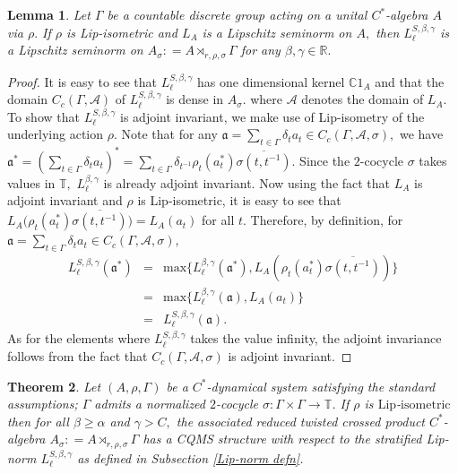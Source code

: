 \documentclass[a4paper,11pt,reqno]{amsart}
\theoremstyle{plain}
\newtheorem{thm}{Theorem}[section]
\newtheorem{lem}[thm]{Lemma}
\theoremstyle{mainthmstyle}
\theoremstyle{named}
\numberwithin{equation}{section}
\newcommand{\Bea}{\begin{eqnarray*}}
\newcommand{\Eea}{\end{eqnarray*}}
\begin{document}
\begin{lem}
Let $\Gamma$ be a countable discrete group acting on a unital $C^{\ast}$-algebra $A$ via $\rho.$ If $\rho$ is Lip-isometric and $L_A$ is a Lipschitz seminorm on $A,$ then $L_{\ell}^{S, \beta, \gamma}$ is a Lipschitz seminorm on $A_{\sigma} : = A \rtimes_{r, \rho, \sigma} \Gamma$ for any $\beta, \gamma \in \mathbb R.$
\end{lem}

\begin{proof}
It is easy to see that $L_{\ell}^{S, \beta, \gamma}$ has one dimensional kernel $\mathbb C 1_A$ and that the domain $C_c \left (\Gamma, \mathcal A \right )$ of $L_{\ell}^{S, \beta, \gamma}$ is dense in $A_{\sigma}$. where $\mathcal A$ denotes the domain of $L_A.$ To show that $L_{\ell}^{S, \beta, \gamma}$ is adjoint invariant, we make use of Lip-isometry of the underlying action $\rho.$ Note that for any $\mathfrak a = \sum\limits_{t \in \Gamma} \delta_t a_t \in C_c (\Gamma, \mathcal A, \sigma),$ we have $\mathfrak {a}^{\ast} = \left (\sum\limits_{t \in \Gamma} \delta_t a_t \right )^{\ast} = \sum\limits_{t \in \Gamma} \delta_{t^{-1}} \rho_t \left (a_t^{\ast} \right ) \overline {\sigma (t, t^{-1})}.$ Since the $2$-cocycle $\sigma$ takes values in $\mathbb T,$ $L_{\ell}^{\beta, \gamma}$ is already adjoint invariant. Now using the fact that $L_A$ is adjoint invariant and $\rho$ is Lip-isometric, it is easy to see that $L_A\big(\rho_t \left (a_t^{\ast} \right ) \overline {\sigma (t, t^{-1})}\big)=L_A(a_t)$ for all $t$. Therefore, by definition, for $\mathfrak{a}=\sum\limits_{t\in \Gamma}\delta_t a_{t}\in C_{c}(\Gamma,\mathcal A,\sigma)$, 
\Bea
L^{S,\beta,\gamma}_{\ell}(\mathfrak{a}^{\ast})&=&\mathrm{max}\{L^{\beta,\gamma}_{\ell}(\mathfrak{a}^{*}), L_{A}(\rho_t \left (a_t^{\ast} \right ) \overline {\sigma (t, t^{-1})})\}\\
&=& \mathrm{max}\{L^{\beta,\gamma}_{\ell}(\mathfrak{a}), L_A(a_t)\}\\
&=& L^{S,\beta,\gamma}_{\ell}(\mathfrak{a}).
\Eea 
As for the elements where $L^{S,\beta,\gamma}_{\ell}$ takes the value infinity, the adjoint invariance follows from the fact that $C_{c}(\Gamma,\mathcal A,\sigma)$ is adjoint invariant.
\end{proof}


\begin{thm}
Let $(A,\rho,\Gamma)$ be a $C^{\ast}$-dynamical system satisfying the standard assumptions; $\Gamma$ admits a normalized $2$-cocycle $\sigma : \Gamma \times \Gamma \rightarrow \mathbb{T}$. If $\rho$ is $\mathrm{Lip}$-$\mathrm {isometric}$ then for all $\beta \geq \alpha$ and $\gamma > C,$ the associated reduced twisted crossed product $C^{\ast}$-algebra $A_{\sigma} : = A \rtimes_{r, \rho, \sigma} \Gamma$ has a CQMS structure with respect to the stratified Lip-norm $L^{S, \beta, \gamma}_{\ell}$ as defined in Subsection \ref{Lip-norm defn}.
\end{thm}
\end{document}
